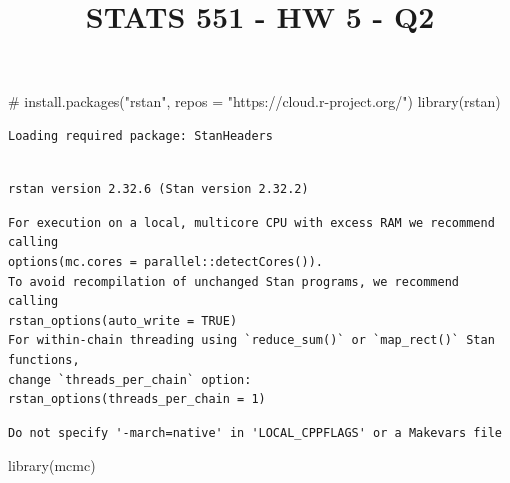 \documentclass[
  10pt,
]{article}
\title{STATS 551 - HW 5 - Q2}
\author{}
\date{}
\newenvironment{Shaded}{\begin{snugshade}}{\end{snugshade}}
\newcommand{\CommentTok}[1]{\textcolor[rgb]{0.37,0.37,0.37}{#1}}
\newcommand{\FunctionTok}[1]{\textcolor[rgb]{0.28,0.35,0.67}{#1}}
\newcommand{\NormalTok}[1]{\textcolor[rgb]{0.00,0.23,0.31}{#1}}
\begin{document}
\maketitle


\begin{Shaded}
\begin{Highlighting}[]
\CommentTok{\# install.packages("rstan", repos = "https://cloud.r{-}project.org/")}
\FunctionTok{library}\NormalTok{(rstan)}
\end{Highlighting}
\end{Shaded}

\begin{verbatim}
Loading required package: StanHeaders
\end{verbatim}

\begin{verbatim}

rstan version 2.32.6 (Stan version 2.32.2)
\end{verbatim}

\begin{verbatim}
For execution on a local, multicore CPU with excess RAM we recommend calling
options(mc.cores = parallel::detectCores()).
To avoid recompilation of unchanged Stan programs, we recommend calling
rstan_options(auto_write = TRUE)
For within-chain threading using `reduce_sum()` or `map_rect()` Stan functions,
change `threads_per_chain` option:
rstan_options(threads_per_chain = 1)
\end{verbatim}

\begin{verbatim}
Do not specify '-march=native' in 'LOCAL_CPPFLAGS' or a Makevars file
\end{verbatim}

\begin{Shaded}
\begin{Highlighting}[]
\FunctionTok{library}\NormalTok{(mcmc)}
\end{Highlighting}
\end{Shaded}
\end{document}

